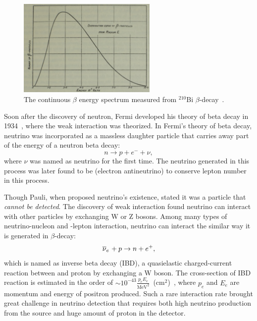 \begin{figure}[h!]
\centering
\includegraphics[width=0.6\textwidth]{Figures/BiSpectrum.png}
\caption[Continuous beta spectrum]{The continuous $\beta$ energy spectrum measured from $^{210}$Bi $\beta$-decay~\cite{bib:EandW}.}
\label{fig:BiSpectrum}
\end{figure}    
    
    Soon after the discovery of neutron, Fermi developed his theory of beta decay in 1934~\cite{bib:Fermi}, where the weak interaction was theorized. 
    In Fermi's theory of beta decay, neutrino was incorporated as a massless daughter particle that carries away part of the energy of a neutron beta decay:
    \begin{equation}\label{eq1.1}
        n \rightarrow p + e^- + \nu,
    \end{equation}
    where $\nu$ was named as neutrino for the first time.
    The neutrino generated in this process was later found to be \nuebar (electron antineutrino) to conserve lepton number in this process.

\label{Ch1Sec2}

    Though Pauli, when proposed neutrino's existence, stated it was a particle that \textit{cannot be detected}.
    The discovery of weak interaction found neutrino can interact with other particles by exchanging W or Z bosons.
    Among many types of neutrino-nucleon and -lepton interaction, neutrino can interact the similar way it is generated in $\beta$-decay:
    \begin{equation}
        \label{eq:IBD}
        \overline{\nu }_{e}\hspace{1pt} + p \rightarrow n + e^+,
    \end{equation}
    which is named as inverse beta decay (IBD), a quasielastic charged-current reaction between \nuebar and proton by exchanging a W boson.
    The cross-section of IBD reaction is estimated in the order of $\sim 10^{-43}\frac{p_eE_e}{\text{MeV}^2}$~(cm$^2$)~\cite{bib:IBDXsection}, where $p_e$ and $E_e$ are momentum and energy of positron produced.
    Such a rare interaction rate brought great challenge in neutrino detection that requires both high neutrino production from the source and huge amount of proton in the detector.
    
